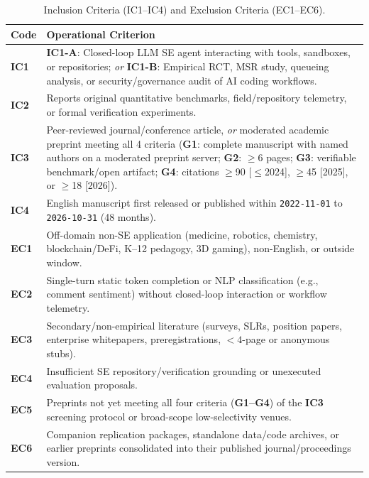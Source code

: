 \documentclass[10pt,twocolumn,a4paper]{article}
\begin{document}
\begin{table}[t!]
\centering
\caption{Inclusion Criteria (IC1--IC4) and Exclusion Criteria (EC1--EC6).}
\label{tab:criteria}
\footnotesize
\setlength{\tabcolsep}{3.8pt}
\begin{tabularx}{\columnwidth}{l X}
\toprule
\textbf{Code} & \textbf{Operational Criterion} \\
\midrule
\textbf{IC1} & \textbf{IC1-A}: Closed-loop LLM SE agent interacting with tools, sandboxes, or repositories; \emph{or} \textbf{IC1-B}: Empirical RCT, MSR study, queueing analysis, or security/governance audit of AI coding workflows. \\
\textbf{IC2} & Reports original quantitative benchmarks, field/repository telemetry, or formal verification experiments. \\
\textbf{IC3} & Peer-reviewed journal/conference article, \emph{or} moderated academic preprint meeting all 4 criteria (\textbf{G1}: complete manuscript with named authors on a moderated preprint server; \textbf{G2}: $\ge$6 pages; \textbf{G3}: verifiable benchmark/open artifact; \textbf{G4}: citations $\ge$90 [$\le$2024], $\ge$45 [2025], or $\ge$18 [2026]). \\
\textbf{IC4} & English manuscript first released or published within \texttt{2022-11-01} to \texttt{2026-10-31} (48 months). \\
\midrule
\textbf{EC1} & Off-domain non-SE application (medicine, robotics, chemistry, blockchain/DeFi, K--12 pedagogy, 3D gaming), non-English, or outside window. \\
\textbf{EC2} & Single-turn static token completion or NLP classification (e.g., comment sentiment) without closed-loop interaction or workflow telemetry. \\
\textbf{EC3} & Secondary/non-empirical literature (surveys, SLRs, position papers, enterprise whitepapers, preregistrations, $<4$-page or anonymous stubs). \\
\textbf{EC4} & Insufficient SE repository/verification grounding or unexecuted evaluation proposals. \\
\textbf{EC5} & Preprints not yet meeting all four criteria (\textbf{G1--G4}) of the \textbf{IC3} screening protocol or broad-scope low-selectivity venues. \\
\textbf{EC6} & Companion replication packages, standalone data/code archives, or earlier preprints consolidated into their published journal/proceedings version. \\
\bottomrule
\end{tabularx}
\end{table}
\end{document}
